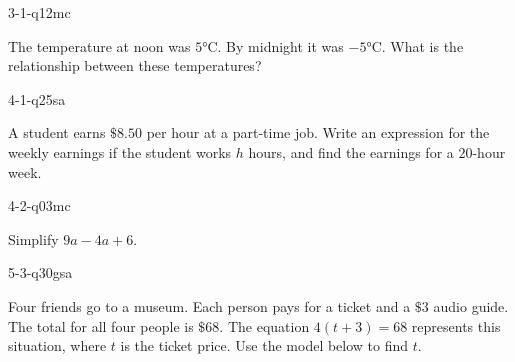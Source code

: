 \begin{practiceQuestion}{3-1-q12}{mc}
\begin{questionText}
The temperature at noon was $5°$C. By midnight it was $-5°$C. What is the relationship between these temperatures?
\end{questionText}
\end{practiceQuestion}

\begin{practiceQuestion}{4-1-q25}{sa}
\begin{questionText}
A student earns $\$8.50$ per hour at a part-time job. Write an expression for the weekly earnings if the student works $h$ hours, and find the earnings for a $20$-hour week.
\end{questionText}
\end{practiceQuestion}

\begin{practiceQuestion}{4-2-q03}{mc}
\begin{questionText}
Simplify $9a - 4a + 6$.
\end{questionText}
\end{practiceQuestion}

\begin{practiceQuestion}{5-3-q30}{gsa}
\begin{questionText}
Four friends go to a museum. Each person pays for a ticket and a $\$3$ audio guide. The total for all four people is $\$68$. The equation $4(t + 3) = 68$ represents this situation, where $t$ is the ticket price. Use the model below to find $t$.

\begin{center}
\end{center}
\end{questionText}
\end{practiceQuestion}

